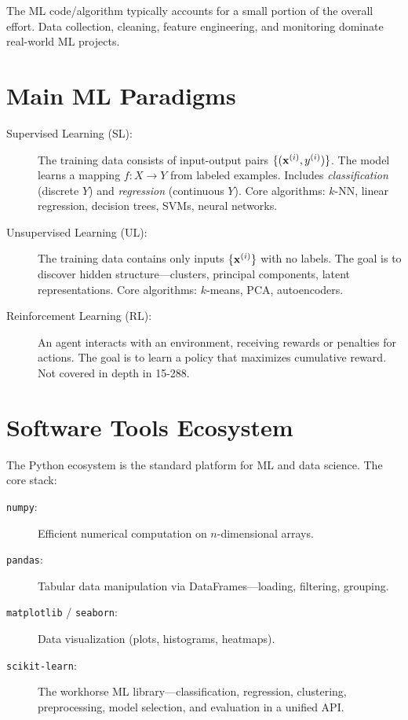 \begin{remark}
The ML code/algorithm typically accounts for a small portion of the overall effort. Data collection, cleaning, feature engineering, and monitoring dominate real-world ML projects.
\end{remark}

\section*{Main ML Paradigms}

\begin{description}
    \item[Supervised Learning (SL):] The training data consists of input-output pairs $\{(\mathbf{x}^{(i)}, y^{(i)})\}$. The model learns a mapping $f: X \to Y$ from labeled examples. Includes \textit{classification} (discrete $Y$) and \textit{regression} (continuous $Y$). Core algorithms: $k$-NN, linear regression, decision trees, SVMs, neural networks.
    \item[Unsupervised Learning (UL):] The training data contains only inputs $\{\mathbf{x}^{(i)}\}$ with no labels. The goal is to discover hidden structure---clusters, principal components, latent representations. Core algorithms: $k$-means, PCA, autoencoders.
    \item[Reinforcement Learning (RL):] An agent interacts with an environment, receiving rewards or penalties for actions. The goal is to learn a policy that maximizes cumulative reward. Not covered in depth in 15-288.
\end{description}

\section*{Software Tools Ecosystem}

The Python ecosystem is the standard platform for ML and data science. The core stack:

\begin{description}
    \item[\texttt{numpy}:] Efficient numerical computation on $n$-dimensional arrays.
    \item[\texttt{pandas}:] Tabular data manipulation via DataFrames---loading, filtering, grouping.
    \item[\texttt{matplotlib} / \texttt{seaborn}:] Data visualization (plots, histograms, heatmaps).
    \item[\texttt{scikit-learn}:] The workhorse ML library---classification, regression, clustering, preprocessing, model selection, and evaluation in a unified API.
\end{description}

